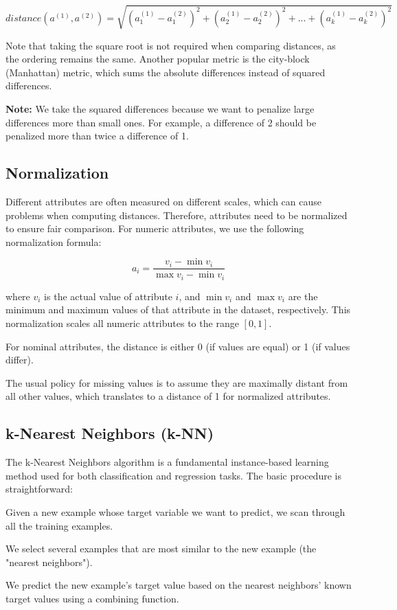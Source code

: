     \begin{equation}
    distance(a^{(1)}, a^{(2)}) = \sqrt{(a_1^{(1)} - a_1^{(2)})^2 + (a_2^{(1)} - a_2^{(2)})^2 + ... + (a_k^{(1)} - a_k^{(2)})^2}
    \end{equation}

    Note that taking the square root is not required when comparing distances, as the ordering remains the same. Another popular metric is the city-block (Manhattan) metric, which sums the absolute differences instead of squared differences.
   
    \textbf{Note:} We take the squared differences because we want to penalize large differences more than small ones. For example, a difference of 2 should be penalized more than twice a difference of 1.

\subsection{Normalization}

    Different attributes are often measured on different scales, which can cause problems when computing distances. Therefore, attributes need to be normalized to ensure fair comparison. For numeric attributes, we use the following normalization formula:

    \begin{equation}
    a_i = \frac{v_i - \min v_i}{\max v_i - \min v_i}
    \end{equation}

    where $v_i$ is the actual value of attribute $i$, and $\min v_i$ and $\max v_i$ are the minimum and maximum values of that attribute in the dataset, respectively. This normalization scales all numeric attributes to the range $[0,1]$.

    For nominal attributes, the distance is either 0 (if values are equal) or 1 (if values differ). 

    The usual policy for missing values is to assume they are maximally distant from all other values, which translates to a distance of 1 for normalized attributes.


    \subsection{k-Nearest Neighbors (k-NN)}
    The k-Nearest Neighbors algorithm is a fundamental instance-based learning method used for both classification and regression tasks. The basic procedure is straightforward:
    \begin{compactitemize}
        \item Given a new example whose target variable we want to predict, we scan through all the training examples.
        \item We select several examples that are most similar to the new example (the "nearest neighbors").
        \item We predict the new example's target value based on the nearest neighbors' known target values using a combining function.
    \end{compactitemize}
    
